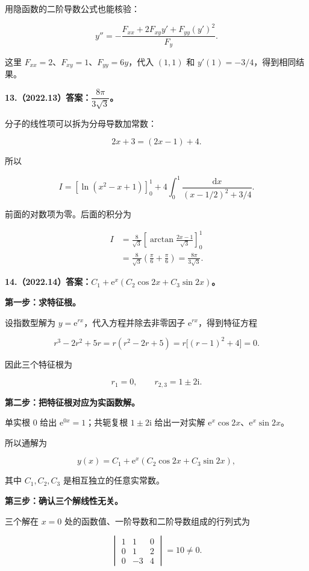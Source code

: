 \documentclass[UTF8,11pt,fontset=windows]{ctexart}
\begin{document}
用隐函数的二阶导数公式也能核验：

$$
y''=-\frac{F_{xx}+2F_{xy}y'+F_{yy}(y')^2}{F_y}.
$$

这里 $F_{xx}=2$、$F_{xy}=1$、$F_{yy}=6y$，代入 $(1,1)$ 和 $y'(1)=-3/4$，得到相同结果。

\clearpage

\textbf{13.（2022.13）答案：$\dfrac{8\pi}{3\sqrt3}$。}

分子的线性项可以拆为分母导数加常数：

$$
2x+3=(2x-1)+4.
$$

所以

$$
I=\left[\ln(x^2-x+1)\right]_0^1
+4\int_0^1\frac{\mathrm dx}{(x-1/2)^2+3/4}.
$$

前面的对数项为零。后面的积分为

$$
\begin{aligned}
I&=\frac8{\sqrt3}\left[\arctan\frac{2x-1}{\sqrt3}\right]_0^1\\
&=\frac8{\sqrt3}\left(\frac\pi6+\frac\pi6\right)
=\frac{8\pi}{3\sqrt3}.
\end{aligned}
$$

\clearpage

\textbf{14.（2022.14）答案：$C_1+\mathrm e^x(C_2\cos2x+C_3\sin2x)$。}

\textbf{第一步：求特征根。}

设指数型解为 $y=\mathrm e^{rx}$，代入方程并除去非零因子 $\mathrm e^{rx}$，得到特征方程

$$
r^3-2r^2+5r=r(r^2-2r+5)=r\bigl[(r-1)^2+4\bigr]=0.
$$

因此三个特征根为

$$
r_1=0,\qquad r_{2,3}=1\pm2\mathrm i.
$$

\textbf{第二步：把特征根对应为实函数解。}

单实根 $0$ 给出 $\mathrm e^{0x}=1$；共轭复根 $1\pm2\mathrm i$ 给出一对实解 $\mathrm e^x\cos2x$、$\mathrm e^x\sin2x$。

所以通解为

$$
\boxed{y(x)=C_1+\mathrm e^x(C_2\cos2x+C_3\sin2x)},
$$

其中 $C_1,C_2,C_3$ 是相互独立的任意实常数。

\textbf{第三步：确认三个解线性无关。}

三个解在 $x=0$ 处的函数值、一阶导数和二阶导数组成的行列式为

$$
\begin{vmatrix}1&1&0\\0&1&2\\0&-3&4\end{vmatrix}=10\ne0.
$$
\end{document}
